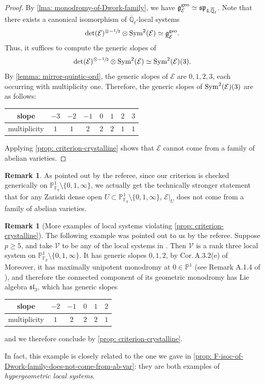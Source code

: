 \documentclass[JEP,XML,SOM,Unicode,published]{cedram}
\numberwithin{equation}{subsection}
\theoremstyle{definition}
\newtheorem{rmk}[thm]{Remark}
\newcommand{\Qlbar}{\overline{\mathbb{Q}}_{\ell}}
\let\mc\mathcal
\let\mb\mathbb
\begin{document}
\begin{proof}
By \cref{lma: monodromy-of-Dwork-family}, we have $\mathfrak{g}^{\rm{geo}}_{\mc{E}}\simeq\mathfrak{sp}_{4,\Qlbar}$. Note that there exists a canonical isomorphism of $\Qlbar$-local systems
\[
\det(\mc{E})^{\otimes-\sfrac{1}{2}}\otimes \rm{Sym}^2(\mc{E})\simeq\underline{\mathfrak{g}}_{\mathcal{E}}^\mathrm{geo}.
\]
Thus, it suffices to compute the generic slopes of
\[
\det(\mc{E})^{\otimes-\sfrac{1}{2}}\otimes \rm{Sym}^2(\mc{E})\simeq\rm{Sym}^2(\mc{E})(3).
\]
By \cref{lemma: mirror-quintic-ord}, the generic slopes of $\mc{E}$ are $0,1,2,3$, each occurring with multiplicity one. Therefore, the generic slopes of $\rm{Sym}^2(\mc{E})(3)$ are as follows:
\begin{center}
\begin{tabular}{ c|c|c|c|c|c|c|c }
slope & $-3$ & $-2$ & $-1$ & $0$ & $1$ & $2$ & $3$\\
\hline
multiplicity & $1$ & $1$ & $2$ & $2$ & $2$ & $1$ & $1$
\end{tabular}
\end{center}
Applying \cref{prop: criterion-crystalline} shows that $\mc{E}$ cannot come from a family of abelian varieties.
\end{proof}

\begin{rmk}
As pointed out by the referee, since our criterion is checked generically on $\mb{P}^1_{\mb{F}_q}\setminus \{0,1,\infty\}$, we actually get the technically stronger statement that for any Zariski dense open $U\subset \mb{P}^1_{\mb{F}_q}\setminus \{0,1, \infty\}$, $\mc{E}|_{U}$ does not come from a family of abelian varieties.
\end{rmk}

\begin{rmk}[More examples of local systems violating \cref{prop: criterion-crystalline}]\label{rmk: more-examples}
The following example was pointed out to us by the referee. Suppose $p\geq 5$, and take $\mc{V}$ to be any of the local systems in \cite[Prop.\,A.2.1]{Drinfeld-Kedlaya-Slopes-of-Indecomposable-F-Isocrystals}. Then $\mc{V}$ is a rank three local system on $\mb{P}^1_{\mb{F}_p}\setminus \{0,1,\infty\}$. It has generic slopes $0,1,2$, by Cor.\,A.3.2(e) of \loccit Moreover, it has maximally unipotent monodromy at $0\in \mb{P}^1$ (see Remark A.1.4 of \loccit), and therefore the connected component of its geometric monodromy has Lie algebra $\mathfrak{sl}_3$, which has generic slopes

\begin{center}
\begin{tabular}{ c|c|c|c|c|c }
slope & $-2$ & $-1$ & $0$ & $1$ & $2$ \\
\hline
multiplicity & $1$ & $2$ & $2$ & $2$ & $1$
\end{tabular}
\end{center}
and we therefore conclude by \cref{prop: criterion-crystalline}.

In fact, this example is closely related to the one we gave in \cref{prop: F-isoc-of-Dwork-family-does-not-come-from-ab-var}: they are both examples of \emph{hypergeometric local systems}.
\end{rmk}
\end{document}
